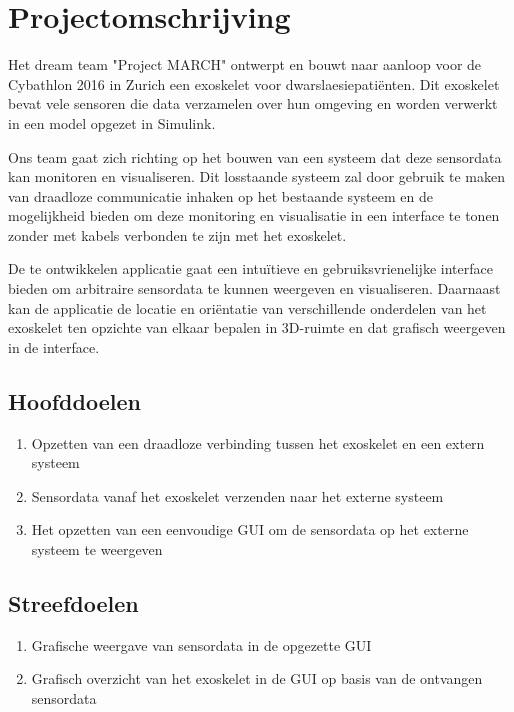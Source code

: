\section{Projectomschrijving}
Het dream team "Project MARCH" ontwerpt en bouwt naar aanloop voor de Cybathlon 2016 in Zurich een exoskelet voor dwarslaesiepatiënten. Dit exoskelet bevat vele sensoren die data verzamelen over hun omgeving en worden verwerkt in een model opgezet in Simulink.

Ons team gaat zich richting op het bouwen van een systeem dat deze sensordata kan monitoren en visualiseren. Dit losstaande systeem zal door gebruik te maken van draadloze communicatie inhaken op het bestaande systeem en de mogelijkheid bieden om deze monitoring en visualisatie in een interface te tonen zonder met kabels verbonden te zijn met het exoskelet.

De te ontwikkelen applicatie gaat een intuïtieve en gebruiksvrienelijke interface bieden om arbitraire sensordata te kunnen weergeven en visualiseren. Daarnaast kan de applicatie de locatie en oriëntatie van verschillende onderdelen van het exoskelet ten opzichte van elkaar bepalen in 3D-ruimte en dat grafisch weergeven in de interface.
\subsection{Hoofddoelen}
\begin{enumerate}
 \item Opzetten van een draadloze verbinding tussen het exoskelet en een extern systeem
 \item Sensordata vanaf het exoskelet verzenden naar het externe systeem
 \item Het opzetten van een eenvoudige GUI om de sensordata op het externe systeem te weergeven
\end{enumerate}
\subsection{Streefdoelen}
\begin{enumerate}
 \item Grafische weergave van sensordata in de opgezette GUI
 \item Grafisch overzicht van het exoskelet in de GUI op basis van de ontvangen sensordata
\end{enumerate}

